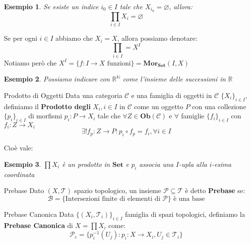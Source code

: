 \documentclass[11pt,a4paper,twoside]{article}
\newtheorem{es}{Esempio}
\theoremstyle{definition}
\begin{document}
\begin{es}
	Se esiste un indice $i_0 \in I$ tale che $X_{i_0} = \varnothing$, allora:
	\[ \prod_{i \in I}X_i = \varnothing \]
\end{es}

Se per ogni $i \in I$ abbiamo che $X_i = X$, allora possiamo denotare:
\[ \prod_{i \in I} = X^I \]
Notiamo però che $X^I = \{f:I \to X \text{ funzioni}\} = \bm{Mor_{Set}}(I,X)$

\begin{es}
	Possiamo indicare con $\mathbb R^\mathbb N$ come l'insieme delle successioni in $\mathbb R$
\end{es}

\begin{defn}{Prodotto di Oggetti}{}{}
	Data una categoria $\mathcal C$ e una famiglia di oggetti in $\mathcal C$ $\{X_i\}_{i \in I}$, definiamo il \textbf{Prodotto degli }$X_i, i \in I$ in $\mathcal C$ come un oggetto $P$ con una collezione $\{p_i\}_{i \in I}$ di morfismi $p_i:P \to X_i$ tale che $\forall Z \in \bm{Ob}(\mathcal C)$ e $\forall$ famiglie $\{f_i\}_{i \in I}$ con $f_i:Z \to X_i$
	\[ \exists ! f_p:Z \to P : p_i \circ f_p = f_i, \forall i \in I \]
\end{defn}

Cioè vale:
\begin{center}
\end{center}

\begin{es}
	$\prod X_i$ è un prodotto in $\bm{Set}$ e $p_i$ associa una $I$-upla alla $i$-esima coordinata
\end{es}

\begin{defn}{Prebase}{}{}
	Dato $(X, \mathcal T)$ spazio topologico, un insieme $\mathcal P \subseteq \mathcal T$ è detto \textbf{Prebase} se:
	\[ \mathcal B = \{\text{Intersezioni finite di elementi di }\mathcal P\}\text{ è una base} \]
\end{defn}

\begin{defn}{Prebase Canonica}{}{}
	Data $\{(X_i, \mathcal T_i)\}_{i \in I}$ famiglia di spazi topologici, definiamo la \textbf{Prebase Canonica} di $X = \prod X_i$ come:
	\[ \mathcal P_c = \{ p^{-1}_i(U_j) : p_i:X \to X_i, U_j \in \mathcal T_i  \} \]
\end{defn}
\end{document}
